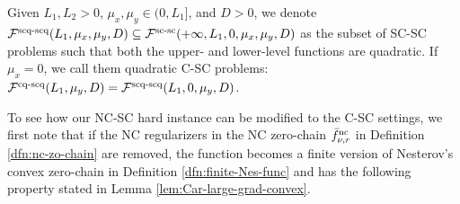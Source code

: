\documentclass{article}
\begin{document}
\begin{dfn}  \label{dfn:SC-SC-func-quadra}
Given $L_1,L_2>0$, $\mu_x,\mu_y \in (0,L_1]$, and $D>0$, we denote
${\mathcal{F}}^{\text{scq-scq}}(L_1,\mu_x,\mu_y, D) \subseteq {\mathcal{F}}^{\text{sc-sc}}(+\infty, L_1, 0 ,\mu_x,\mu_y, D)$ as the subset of SC-SC problems such that both the upper- and lower-level functions are quadratic. If $\mu_x=0$, we call them quadratic C-SC problems: ${\mathcal{F}}^\text{cq-scq}(L_1,\mu_y,D) = {\mathcal{F}}^\text{scq-scq}(L_1,0,\mu_y,D)$.
\end{dfn}

To see how our NC-SC hard instance can be modified to the C-SC settings, we first note that if the NC regularizers in the NC zero-chain $\bar f_{\nu,r}^{\rm nc}$ in Definition \ref{dfn:nc-zo-chain} are removed, the function becomes a finite version of Nesterov's convex zero-chain in Definition \ref{dfn:finite-Nes-func} and has the following property stated in Lemma \ref{lem:Car-large-grad-convex}.





\end{document}
